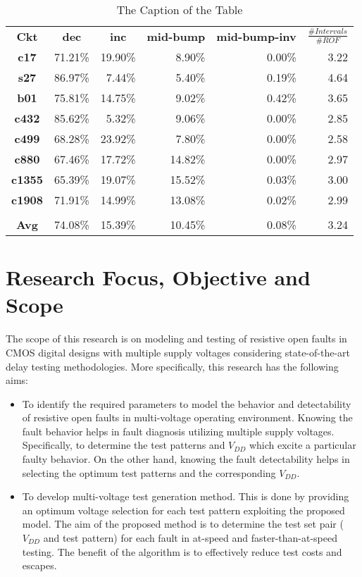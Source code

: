 \begin{table}[htbp]
  \centering
  \caption{The Caption of the Table}
    \begin{tabular}{crrrrr}
    \textbf{Ckt} & \multicolumn{1}{c}{\textbf{dec}} & \multicolumn{1}{c}{\textbf{inc}} & \multicolumn{1}{c}{\textbf{mid-bump}} & \multicolumn{1}{c}{\textbf{mid-bump-inv}} & \multicolumn{1}{c}{\textbf{$\frac{\#Intervals}{\#ROF}$}} \\
    \textbf{c17} & 71.21\% & 19.90\% & 8.90\% & 0.00\% & 3.22 \\
    \textbf{s27} & 86.97\% & 7.44\% & 5.40\% & 0.19\% & 4.64 \\
    \textbf{b01} & 75.81\% & 14.75\% & 9.02\% & 0.42\% & 3.65 \\
    \textbf{c432} & 85.62\% & 5.32\% & 9.06\% & 0.00\% & 2.85 \\
    \textbf{c499} & 68.28\% & 23.92\% & 7.80\% & 0.00\% & 2.58 \\
    \textbf{c880} & 67.46\% & 17.72\% & 14.82\% & 0.00\% & 2.97 \\
    \textbf{c1355} & 65.39\% & 19.07\% & 15.52\% & 0.03\% & 3.00 \\
    \textbf{c1908} & 71.91\% & 14.99\% & 13.08\% & 0.02\% & 2.99 \\
    \textbf{} &       &       &       &       &  \\
    \textbf{Avg} & 74.08\% & 15.39\% & 10.45\% & 0.08\% & 3.24 \\
    \end{tabular}%
  \label{tab:addlabel}%
\end{table}%


\section{Research Focus, Objective and Scope}
The scope of this research is on modeling and testing of resistive open faults in CMOS digital designs  with multiple supply voltages considering state-of-the-art delay testing methodologies. More specifically, this research has the following aims:
\begin{itemize}
	\item To identify the required parameters to model the behavior and detectability of resistive open faults in multi-voltage operating environment. Knowing the fault behavior helps in fault diagnosis utilizing multiple supply voltages. Specifically, to determine the test patterns and $V_{DD}$ which excite a particular faulty behavior. On the other hand, knowing the fault detectability helps in selecting the optimum test patterns and the corresponding $V_{DD}$.
	
	\item To develop multi-voltage test generation method. This is done by providing an optimum voltage selection for each test pattern exploiting the proposed model. The aim of the proposed method is to determine the test set pair ($V_{DD}$ and test pattern) for each fault in at-speed and faster-than-at-speed testing. The benefit of the algorithm is to effectively reduce test costs and escapes.
\end{itemize}

